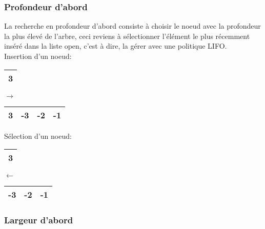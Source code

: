 \subsubsection{Profondeur d'abord}
La recherche en profondeur d’abord consiste à choisir le noeud avec la profondeur la plus élevé de l’arbre, ceci reviens à sélectionner l’élément le plus récemment inséré dans la liste open, c’est à dire, la gérer avec une politique LIFO.\\
Insertion d'un noeud:\\
\begin{minipage}{0.5\textwidth}
	\centering
	\begin{tabular}{|c |}
		\hline
		 3 \\
		\hline
	\end{tabular}
\end{minipage}
\hfillx
$\rightarrow$
\begin{minipage}{0.5\textwidth}
	\centering
	\begin{tabular}{|c | c| c| c|}
		\hline
		{\color{red}3} & -3 & -2 & -1 \\\hline
	\end{tabular}
\end{minipage}

Sélection d'un noeud:\\
\begin{minipage}{0.5\textwidth}
	\centering
	\begin{tabular}{|c |}
		\hline
		{\color{red}3} \\
		\hline
	\end{tabular}
\end{minipage}
\hfillx
$\leftarrow$
\begin{minipage}{0.5\textwidth}
	\centering
	\begin{tabular}{| c| c| c|}
		\hline
		-3 & -2 & -1 \\\hline
	\end{tabular}
\end{minipage}


\subsubsection{Largeur d'abord}
\paragraph{}

